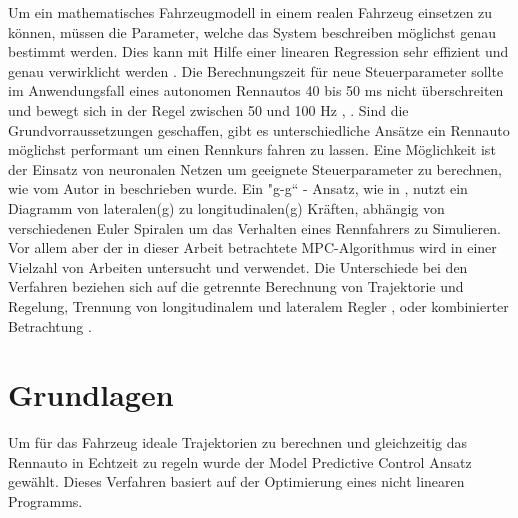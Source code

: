 \documentclass{like}
\begin{document}
Um ein mathematisches Fahrzeugmodell in einem realen Fahrzeug einsetzen zu können, müssen die Parameter, welche das System beschreiben möglichst genau bestimmt werden. Dies kann mit Hilfe einer linearen Regression sehr effizient und genau verwirklicht werden \cite{Williams2016AggressiveDW}. Die  Berechnungszeit für neue Steuerparameter sollte im Anwendungsfall eines autonomen Rennautos 40 bis 50 ms nicht überschreiten und bewegt sich in der Regel zwischen 50 und 100 Hz \cite{rc_car_1_43}, \cite{Williams2016AggressiveDW}. 
Sind die Grundvorraussetzungen geschaffen, gibt es unterschiedliche Ansätze ein Rennauto möglichst performant um einen Rennkurs fahren zu lassen. Eine Möglichkeit ist der Einsatz von neuronalen Netzen um geeignete Steuerparameter zu berechnen, wie vom Autor in \cite{6374146} beschrieben wurde. 
Ein "g-g`` - Ansatz, wie in \cite{KRITAYAKIRANA2010548}, nutzt ein Diagramm von lateralen(g) zu longitudinalen(g) Kräften, abhängig von verschiedenen Euler Spiralen um das Verhalten eines Rennfahrers zu Simulieren.  Vor allem aber der in dieser Arbeit betrachtete \ac{MPC}-Algorithmus wird in einer Vielzahl von Arbeiten untersucht und verwendet. 
Die Unterschiede bei den Verfahren beziehen sich auf die getrennte Berechnung von Trajektorie und Regelung, Trennung von longitudinalem und lateralem Regler \cite{MPC_Dynamic}, \cite{MPC_Dynamic_Tire_Model} oder kombinierter Betrachtung \cite{rc_car_1_43}.


\chapter{Grundlagen}
Um für das Fahrzeug ideale Trajektorien zu berechnen und gleichzeitig das Rennauto in Echtzeit zu regeln wurde der Model Predictive Control Ansatz gewählt. Dieses Verfahren basiert auf der Optimierung eines nicht linearen Programms.
 
\end{document}
